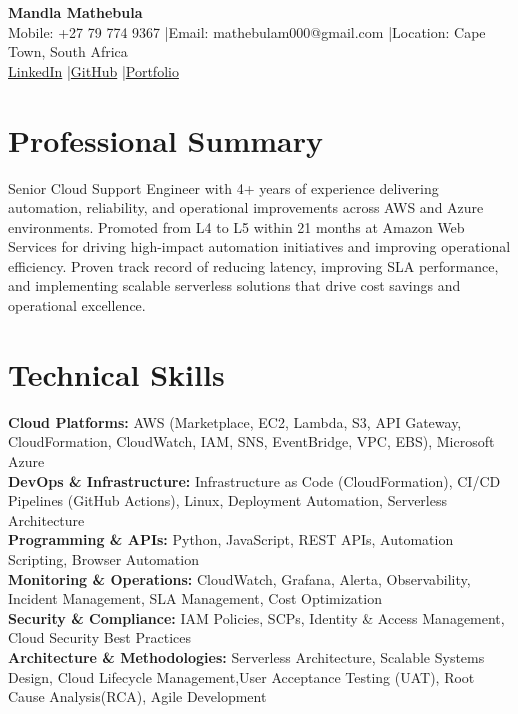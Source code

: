 \documentclass[11pt,a4paper]{article}
\begin{document}
\begin{center}
{\LARGE\bfseries Mandla Mathebula}\\[5pt]
Mobile: +27 79 774 9367 \enspace|\enspace Email: mathebulam000@gmail.com \enspace|\enspace Location: Cape Town, South Africa\\[2pt]
\href{https://linkedin.com/in/mandla-mathebula-4258a518a}{\color{linkblue}LinkedIn} \enspace|\enspace \href{https://github.com/mamathebula}{\color{linkblue}GitHub} \enspace|\enspace \href{https://applyza.co.za/resume_mandla/}{\color{linkblue}Portfolio}
\end{center}

\section{Professional Summary}
Senior Cloud Support Engineer with 4+ years of experience delivering automation, reliability, and operational
improvements across AWS and Azure environments. Promoted from L4 to L5 within 21 months at Amazon
Web Services for driving high-impact automation initiatives and improving operational efficiency. Proven
track record of reducing latency, improving SLA performance, and implementing scalable serverless solutions
that drive cost savings and operational excellence.

\section{Technical Skills}
\textbf{Cloud Platforms:} AWS (Marketplace, EC2, Lambda, S3, API Gateway, CloudFormation, CloudWatch, IAM, SNS, EventBridge, VPC, EBS), Microsoft Azure\\
\textbf{DevOps \& Infrastructure:} Infrastructure as Code (CloudFormation), CI/CD Pipelines (GitHub Actions), Linux, Deployment Automation, Serverless Architecture\\
\textbf{Programming \& APIs:} Python, JavaScript, REST APIs, Automation Scripting, Browser Automation\\
\textbf{Monitoring \& Operations:} CloudWatch, Grafana, Alerta, Observability, Incident Management, SLA Management, Cost Optimization\\
\textbf{Security \& Compliance:} IAM Policies, SCPs, Identity \& Access Management, Cloud Security Best Practices\\
\textbf{Architecture \& Methodologies:} Serverless Architecture, Scalable Systems Design, Cloud Lifecycle Management,User Acceptance Testing (UAT), Root Cause Analysis(RCA), Agile Development\\
\end{document}
